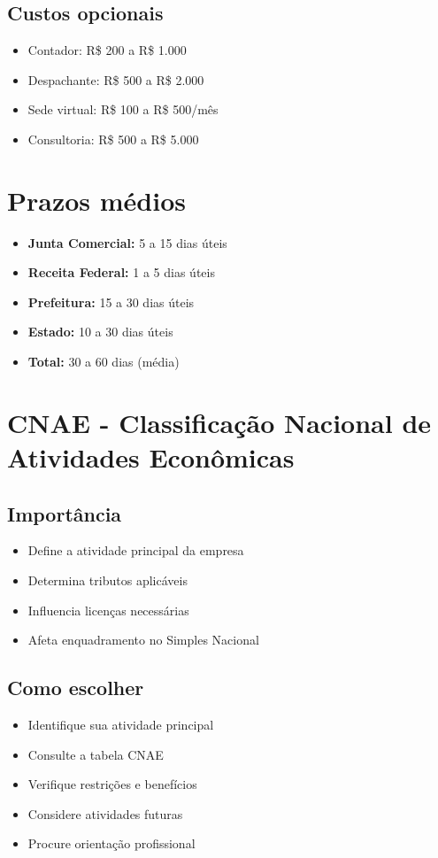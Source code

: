\documentclass[12pt,a4paper]{article}
\begin{document}
\subsection{Custos opcionais}
\begin{itemize}
    \item Contador: R\$ 200 a R\$ 1.000
    \item Despachante: R\$ 500 a R\$ 2.000
    \item Sede virtual: R\$ 100 a R\$ 500/mês
    \item Consultoria: R\$ 500 a R\$ 5.000
\end{itemize}

\section{Prazos médios}

\begin{itemize}
    \item \textbf{Junta Comercial:} 5 a 15 dias úteis
    \item \textbf{Receita Federal:} 1 a 5 dias úteis
    \item \textbf{Prefeitura:} 15 a 30 dias úteis
    \item \textbf{Estado:} 10 a 30 dias úteis
    \item \textbf{Total:} 30 a 60 dias (média)
\end{itemize}

\section{CNAE - Classificação Nacional de Atividades Econômicas}

\subsection{Importância}
\begin{itemize}
    \item Define a atividade principal da empresa
    \item Determina tributos aplicáveis
    \item Influencia licenças necessárias
    \item Afeta enquadramento no Simples Nacional
\end{itemize}

\subsection{Como escolher}
\begin{itemize}
    \item Identifique sua atividade principal
    \item Consulte a tabela CNAE
    \item Verifique restrições e benefícios
    \item Considere atividades futuras
    \item Procure orientação profissional
\end{itemize}
\end{document}

